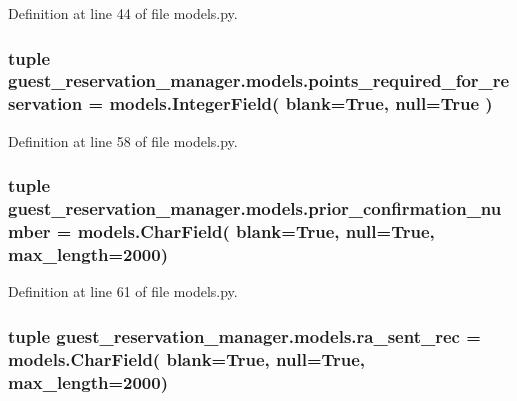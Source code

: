 Definition at line 44 of file models.\-py.

\hypertarget{namespaceguest__reservation__manager_1_1models_a5a97c41c812544cee424bd27b7c8f78a}{
\subsubsection[{points\-\_\-required\-\_\-for\-\_\-reservation}]{\setlength{\rightskip}{0pt plus 5cm}tuple guest\-\_\-reservation\-\_\-manager.\-models.\-points\-\_\-required\-\_\-for\-\_\-reservation = models.\-Integer\-Field( blank=True, null=True )}}\label{namespaceguest__reservation__manager_1_1models_a5a97c41c812544cee424bd27b7c8f78a}


Definition at line 58 of file models.\-py.

\hypertarget{namespaceguest__reservation__manager_1_1models_ad470044825931af57b6cee8ae98c2a02}{
\subsubsection[{prior\-\_\-confirmation\-\_\-number}]{\setlength{\rightskip}{0pt plus 5cm}tuple guest\-\_\-reservation\-\_\-manager.\-models.\-prior\-\_\-confirmation\-\_\-number = models.\-Char\-Field( blank=True, null=True, max\-\_\-length=2000)}}\label{namespaceguest__reservation__manager_1_1models_ad470044825931af57b6cee8ae98c2a02}


Definition at line 61 of file models.\-py.

\hypertarget{namespaceguest__reservation__manager_1_1models_a56af6e6bd58c3a361260e9fee430d403}{
\subsubsection[{ra\-\_\-sent\-\_\-rec}]{\setlength{\rightskip}{0pt plus 5cm}tuple guest\-\_\-reservation\-\_\-manager.\-models.\-ra\-\_\-sent\-\_\-rec = models.\-Char\-Field( blank=True, null=True, max\-\_\-length=2000)}}\label{namespaceguest__reservation__manager_1_1models_a56af6e6bd58c3a361260e9fee430d403}


